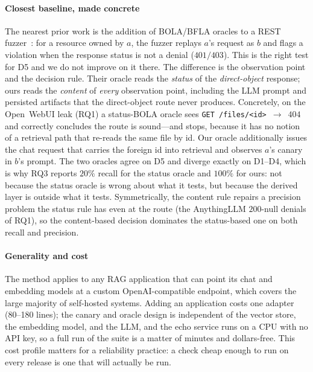 \IfFileExists{IEEEtran.cls}{\documentclass[conference]{IEEEtran}}{\documentclass[10pt,twocolumn]{article}}
\newcommand{\code}[1]{\texttt{\small #1}}
\begin{document}
\paragraph{Closest baseline, made concrete}
The nearest prior work is the addition of BOLA/BFLA oracles to a REST
fuzzer~\cite{arcuri2025fuzzbola}: for a resource owned by $a$, the fuzzer replays $a$'s request as
$b$ and flags a violation when the response status is not a denial ($401/403$). This is the right
test for D5 and we do not improve on it there. The difference is the observation point and the
decision rule. Their oracle reads the \emph{status} of the \emph{direct-object} response; ours reads
the \emph{content} of \emph{every} observation point, including the LLM prompt and persisted
artifacts that the direct-object route never produces. Concretely, on the Open~WebUI leak (RQ1) a
status-BOLA oracle sees \code{GET /files/<id>}~$\to$~$404$ and correctly concludes the route is
sound---and stops, because it has no notion of a retrieval path that re-reads the same file by id.
Our oracle additionally issues the chat request that carries the foreign id into retrieval and
observes $a$'s canary in $b$'s prompt. The two oracles agree on D5 and diverge exactly on D1--D4,
which is why RQ3 reports $20\%$ recall for the status oracle and $100\%$ for ours: not because the
status oracle is wrong about what it tests, but because the derived layer is outside what it tests.
Symmetrically, the content rule repairs a precision problem the status rule has even at the route
(the AnythingLLM $200$-null denials of RQ1), so the content-based decision dominates the status-based
one on both recall and precision.

\paragraph{Generality and cost}
The method applies to any RAG application that can point its chat and embedding models at a custom
OpenAI-compatible endpoint, which covers the large majority of self-hosted systems. Adding an
application costs one adapter (80--180 lines); the canary and oracle design is independent of the
vector store, the embedding model, and the LLM, and the echo service runs on a CPU with no API key,
so a full run of the suite is a matter of minutes and dollars-free. This cost profile matters for a
reliability practice: a check cheap enough to run on every release is one that will actually be run.
\end{document}

